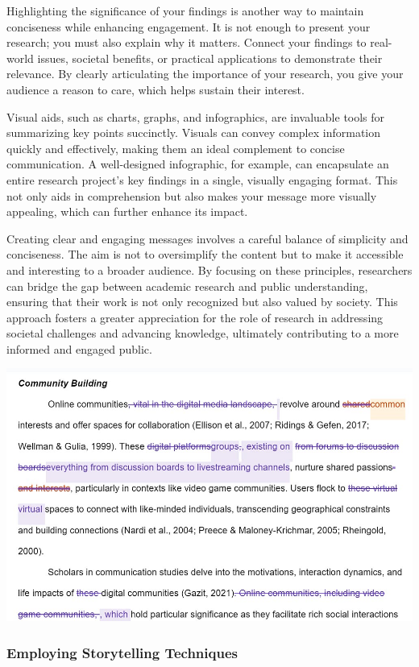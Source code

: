 \documentclass[
]{book}
\begin{document}
Highlighting the significance of your findings is another way to maintain conciseness while enhancing engagement. It is not enough to present your research; you must also explain why it matters. Connect your findings to real-world issues, societal benefits, or practical applications to demonstrate their relevance. By clearly articulating the importance of your research, you give your audience a reason to care, which helps sustain their interest.

Visual aids, such as charts, graphs, and infographics, are invaluable tools for summarizing key points succinctly. Visuals can convey complex information quickly and effectively, making them an ideal complement to concise communication. A well-designed infographic, for example, can encapsulate an entire research project's key findings in a single, visually engaging format. This not only aids in comprehension but also makes your message more visually appealing, which can further enhance its impact.

Creating clear and engaging messages involves a careful balance of simplicity and conciseness. The aim is not to oversimplify the content but to make it accessible and interesting to a broader audience. By focusing on these principles, researchers can bridge the gap between academic research and public understanding, ensuring that their work is not only recognized but also valued by society. This approach fosters a greater appreciation for the role of research in addressing societal challenges and advancing knowledge, ultimately contributing to a more informed and engaged public.

\includegraphics[width=1\linewidth,height=\textheight,keepaspectratio]{images/fig087.jpg}

\subsubsection*{Employing Storytelling Techniques}\label{employing-storytelling-techniques-1}
\end{document}
